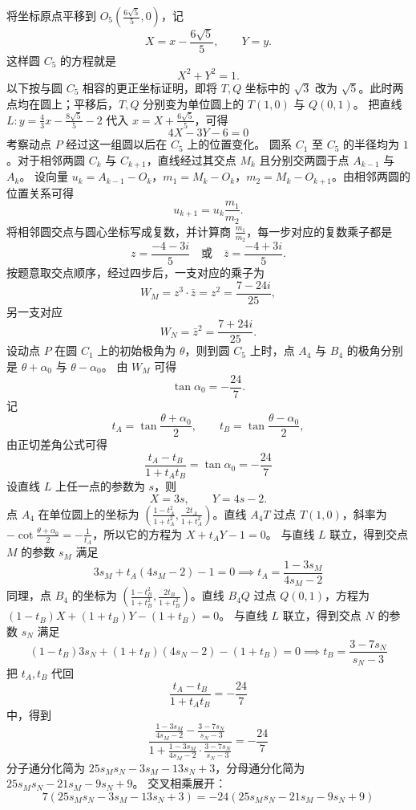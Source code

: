 \begin{solution}
将坐标原点平移到 $O_5\left(\frac{6\sqrt{5}}{5}, 0\right)$，记
\[
X = x - \frac{6\sqrt{5}}{5}, \qquad Y = y.
\]
这样圆 $C_5$ 的方程就是
\[
X^2 + Y^2 = 1.
\]
以下按与圆 $C_5$ 相容的更正坐标证明，即将 $T,Q$ 坐标中的 $\sqrt{3}$ 改为 $\sqrt{5}$。此时两点均在圆上；平移后，$T,Q$ 分别变为单位圆上的 $T(1,0)$ 与 $Q(0,1)$。
把直线 $L: y = \frac{4}{3}x - \frac{8\sqrt{5}}{5} - 2$ 代入 $x = X + \frac{6\sqrt{5}}{5}$，可得
$$ 4X - 3Y - 6 = 0 $$
考察动点 $P$ 经过这一组圆以后在 $C_5$ 上的位置变化。
圆系 $C_1$ 至 $C_5$ 的半径均为 $1$。对于相邻两圆 $C_k$ 与 $C_{k+1}$，直线经过其交点 $M_k$ 且分别交两圆于点 $A_{k-1}$ 与 $A_k$。
设向量 $u_k = A_{k-1} - O_k$，$m_1 = M_k - O_k$，$m_2 = M_k - O_{k+1}$。由相邻两圆的位置关系可得
\[
u_{k+1} = u_k \frac{m_1}{m_2}.
\]
将相邻圆交点与圆心坐标写成复数，并计算商 $\frac{m_1}{m_2}$，每一步对应的复数乘子都是
\[
z = \frac{-4-3i}{5} \quad \text{或} \quad \bar{z} = \frac{-4+3i}{5}.
\]
按题意取交点顺序，经过四步后，一支对应的乘子为
\[
W_M = z^3 \cdot \bar{z} = z^2 = \frac{7 - 24i}{25},
\]
另一支对应
\[
W_N = \bar{z}^2 = \frac{7 + 24i}{25}.
\]
设动点 $P$ 在圆 $C_1$ 上的初始极角为 $\theta$，则到圆 $C_5$ 上时，点 $A_4$ 与 $B_4$ 的极角分别是 $\theta + \alpha_0$ 与 $\theta - \alpha_0$。
由 $W_M$ 可得
\[
\tan\alpha_0 = -\frac{24}{7}.
\]
记
\[
t_A = \tan\frac{\theta+\alpha_0}{2}, \qquad t_B = \tan\frac{\theta-\alpha_0}{2},
\]
由正切差角公式可得
$$ \frac{t_A - t_B}{1 + t_A t_B} = \tan\alpha_0 = -\frac{24}{7} $$
设直线 $L$ 上任一点的参数为 $s$，则
\[
X = 3s, \qquad Y = 4s - 2.
\]
点 $A_4$ 在单位圆上的坐标为 $\left(\frac{1-t_A^2}{1+t_A^2}, \frac{2t_A}{1+t_A^2}\right)$。直线 $A_4T$ 过点 $T(1,0)$，斜率为 $-\cot\frac{\theta+\alpha_0}{2} = -\frac{1}{t_A}$，所以它的方程为 $X + t_A Y - 1 = 0$。
与直线 $L$ 联立，得到交点 $M$ 的参数 $s_M$ 满足
$$ 3s_M + t_A(4s_M - 2) - 1 = 0 \implies t_A = \frac{1 - 3s_M}{4s_M - 2} $$
同理，点 $B_4$ 的坐标为 $\left(\frac{1-t_B^2}{1+t_B^2}, \frac{2t_B}{1+t_B^2}\right)$。直线 $B_4Q$ 过点 $Q(0,1)$，方程为 $(1 - t_B)X + (1 + t_B)Y - (1 + t_B) = 0$。
与直线 $L$ 联立，得到交点 $N$ 的参数 $s_N$ 满足
$$ (1 - t_B)3s_N + (1 + t_B)(4s_N - 2) - (1 + t_B) = 0 \implies t_B = \frac{3 - 7s_N}{s_N - 3} $$
把 $t_A,t_B$ 代回
\[
\frac{t_A - t_B}{1 + t_A t_B} = -\frac{24}{7}
\]
中，得到
$$ \frac{\frac{1 - 3s_M}{4s_M - 2} - \frac{3 - 7s_N}{s_N - 3}}{1 + \frac{1 - 3s_M}{4s_M - 2} \cdot \frac{3 - 7s_N}{s_N - 3}} = -\frac{24}{7} $$
分子通分化简为 $25s_M s_N - 3s_M - 13s_N + 3$，分母通分化简为 $25s_M s_N - 21s_M - 9s_N + 9$。
交叉相乘展开：
$$ 7(25s_M s_N - 3s_M - 13s_N + 3) = -24(25s_M s_N - 21s_M - 9s_N + 9) $$

\end{solution}
